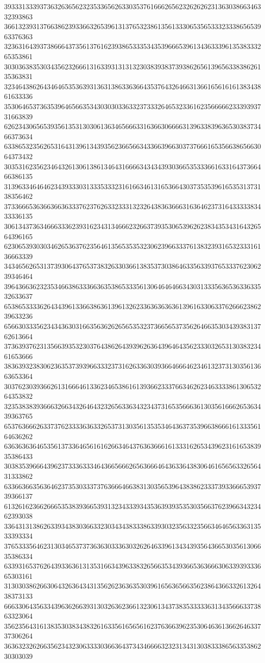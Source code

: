 39333133393736326365623235336562633035376166626562326262623136303866346332393863
36613239313766386239336632653961313765323861356133306535653332333865653963376363
32363164393738666437356137616239386533353435396665396134363339613538333265353861
30303638353034356232666131633931313132303839383739386265613965633838626135363831
32346438626434646535363931363138633636643537643264663136616561616138343861633336
35306465373635396465663534303030336332373332646532336162356666623339393731663839
62623430656539356135313030613634656663316366306666313963383963653038373466373634
63386532356265316431396134393562366566343366396630373766616535663865663064373432
30353162356234643261306138613464316666343434393036653533366163316437366466386135
31396334646462343933303133353332316166346131653664303735353961653531373138356462
37336665363663663633376237626332333132326438363666316364623731643333383433336135
30613437363466633362393162343134666232663739353065396262383435343164326564396165
62306539303034626536376235646135653535323062396633376138323931653233316136663339
34346562653137393064376537383263303661383537303864633563393765333762306239346464
39643663623235346638633366363538653335613064646466343031333563653633633532633637
65386533336264343961336638636139613262336363636361396163306337626662386239633236
65663033356234343630316635636262656535323736656537356264663530343938313762613664
37363937623135663935323037643862643939626364396464356233303265313038323461653666
38363932383062363537393966333237316263363039366466646234613237313035613663653364
30376230393662613166646133623465386161393662333766346262346333386130653264353832
32353838393666326634326464323265633634323437316535666361303561666265363439363765
65376366626337376233336363326537313035613535346436373539663866616133356164636262
63636363646535613733646561616266346437636366616133316265343962316165383935386433
30383539666439623733363334643665666265636664643633643830646165656332656431333862
63366366356364623735303337376366646638313035653964383862333739336665393739366137
61326162366266653538393665393132343339343536393935353035663762396634323462393038
33643131386263393438303663323034343833386339303235633235663464656336313533393334
37653335646231303465373736363033363032626463396134343935643665303561306635386334
63393165376264393363613135316634396338326566353439366536366630633939333665303161
31303038626630643263643431356262363635303961656365663562386436633261326438373133
66633064356334396362663931303263623661323061343738353333363134356663373863323064
35623564316138353038343832616335616565616237636639623530646361366264633737306264
36363232626635623432306333303663643734346666323231343130383338656335386230303039
